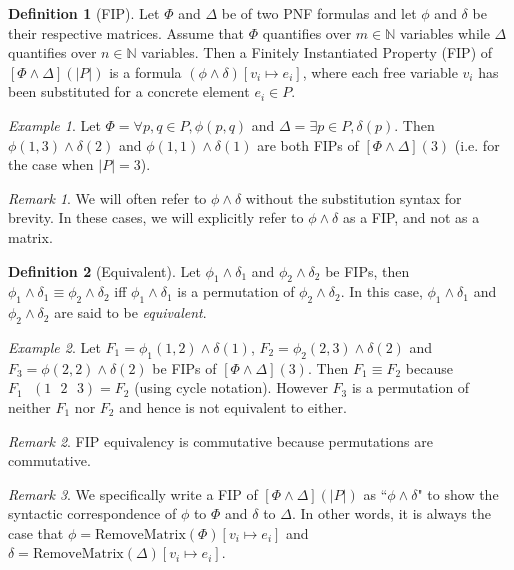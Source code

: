 \documentclass[12pt]{article}
\theoremstyle{definition}
\newtheorem{definition}{Definition}
\theoremstyle{remark}
\newtheorem{example}{Example}
\newtheorem{remark}{Remark}
\newcommand{\msp}{\text{ }}
\begin{document}
\begin{definition}[FIP]
  Let $\Phi$ and $\Delta$ be of two PNF formulas and let $\phi$ and $\delta$ be their respective matrices.  Assume that $\Phi$ quantifies over $m \in \mathbb{N}$ variables while $\Delta$ quantifies over $n \in \mathbb{N}$ variables.  Then a Finitely Instantiated Property (FIP) of $[\Phi\land\Delta](|P|)$ is a formula $(\phi \land \delta) [v_i \mapsto e_i]$, where each free variable $v_i$ has been substituted for a concrete element $e_i \in P$.  
\end{definition}

\begin{example}
  Let $\Phi = \forall p,q \in P, \phi(p,q)$ and $\Delta = \exists p \in P, \delta(p)$.  Then $\phi(1,3)\land\delta(2)$ and $\phi(1,1)\land\delta(1)$ are both FIPs of $[\Phi\land\Delta](3)$ (i.e. for the case when $|P|=3$).
\end{example}

\begin{remark}
  We will often refer to $\phi\land\delta$ without the substitution syntax for brevity.  In these cases, we will explicitly refer to $\phi\land\delta$ as a FIP, and not as a matrix.
\end{remark}

\begin{definition}[Equivalent]
  Let $\phi_1\land\delta_1$ and $\phi_2\land\delta_2$ be FIPs, then $\phi_1\land\delta_1 \equiv \phi_2\land\delta_2$ iff $\phi_1\land\delta_1$ is a permutation of $\phi_2\land\delta_2$.  In this case, $\phi_1\land\delta_1$ and $\phi_2\land\delta_2$ are said to be \textit{equivalent}.
\end{definition}

\begin{example}
  Let $F_1 = \phi_1(1,2) \land \delta(1)$, $F_2 = \phi_2(2,3) \land \delta(2)$ and $F_3 = \phi(2,2) \land \delta(2)$ be FIPs of $[\Phi\land\Delta](3)$.  Then $F_1 \equiv F_2$ because $F_1 \msp (1 \msp 2 \msp 3) = F_2$ (using cycle notation).  However $F_3$ is a permutation of neither $F_1$ nor $F_2$ and hence is not equivalent to either.
\end{example}

\begin{remark}
  \label{rmk:fip-eq-comm}
  FIP equivalency is commutative because permutations are commutative.
\end{remark}

\begin{remark}
  \label{rmk:fip-syntax}
  We specifically write a FIP of $[\Phi\land\Delta](|P|)$ as ``$\phi\land\delta$" to show the syntactic correspondence of $\phi$ to $\Phi$ and $\delta$ to $\Delta$.  In other words, it is always the case that $\phi = \text{RemoveMatrix}(\Phi)[v_i \mapsto e_i]$ and $\delta = \text{RemoveMatrix}(\Delta)[v_i \mapsto e_i]$.
\end{remark}
\end{document}
